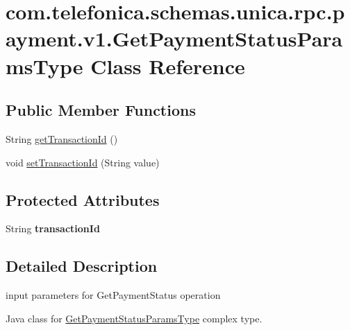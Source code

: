 \hypertarget{classcom_1_1telefonica_1_1schemas_1_1unica_1_1rpc_1_1payment_1_1v1_1_1GetPaymentStatusParamsType}{
\section{com.telefonica.schemas.unica.rpc.payment.v1.GetPaymentStatusParamsType Class Reference}
\label{classcom_1_1telefonica_1_1schemas_1_1unica_1_1rpc_1_1payment_1_1v1_1_1GetPaymentStatusParamsType}
}
\subsection*{Public Member Functions}
\begin{DoxyCompactItemize}
\item 
String \hyperlink{classcom_1_1telefonica_1_1schemas_1_1unica_1_1rpc_1_1payment_1_1v1_1_1GetPaymentStatusParamsType_a3587707cda68e925ee1ad055e89da121}{getTransactionId} ()
\item 
void \hyperlink{classcom_1_1telefonica_1_1schemas_1_1unica_1_1rpc_1_1payment_1_1v1_1_1GetPaymentStatusParamsType_a41bdf12e9382779b000865645ef37c98}{setTransactionId} (String value)
\end{DoxyCompactItemize}
\subsection*{Protected Attributes}
\begin{DoxyCompactItemize}
\item 
\hypertarget{classcom_1_1telefonica_1_1schemas_1_1unica_1_1rpc_1_1payment_1_1v1_1_1GetPaymentStatusParamsType_a42de4d2a7131b8253485c0ed0699d650}{
String {\bfseries transactionId}}
\label{classcom_1_1telefonica_1_1schemas_1_1unica_1_1rpc_1_1payment_1_1v1_1_1GetPaymentStatusParamsType_a42de4d2a7131b8253485c0ed0699d650}

\end{DoxyCompactItemize}


\subsection{Detailed Description}
input parameters for GetPaymentStatus operation

Java class for \hyperlink{classcom_1_1telefonica_1_1schemas_1_1unica_1_1rpc_1_1payment_1_1v1_1_1GetPaymentStatusParamsType}{GetPaymentStatusParamsType} complex type.

